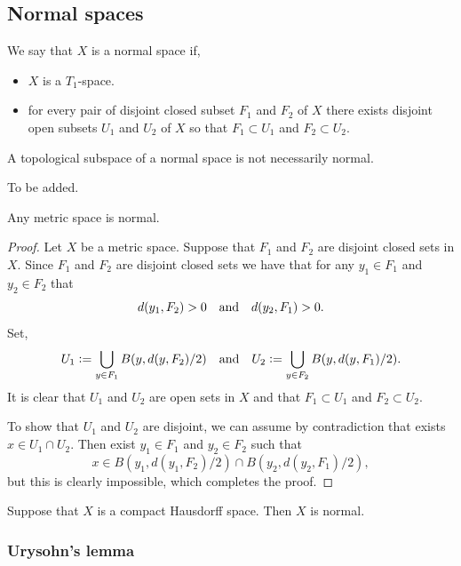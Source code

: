 \documentclass[11pt,a4paper]{article}
\begin{document}
\subsection{Normal spaces}

\begin{definition}
  We say that $X$ is a normal space if,
  \begin{itemize}
      \item[(1)] $X$ is a $T_1$-space.
      \item[(2)] for every pair of disjoint closed subset $F_1$ and $F_2$ 
        of $X$ there exists disjoint open subsets $U_1$ and $U_2$ of $X$
        so that $F_1 \subset U_1$ and $F_2 \subset U_2$.
    \end{itemize}
\end{definition}

\begin{remark}
  A topological subspace of a normal space is not necessarily normal.
\end{remark}
\begin{example}
  To be added.
\end{example}

\begin{proposition}
  Any metric space is normal.
\end{proposition}
\begin{proof}
  Let $X$ be a metric space.
  Suppose that $F_1$ and $F_2$ are disjoint closed sets in $X$.
  Since $F_1$ and $F_2$ are disjoint closed sets we have that for any
  $y_1 \in F_1$ and $y_2 \in F_2$ that
  \[
    d(y_1,F_2) > 0 \quad \text{and} \quad d(y_2,F_1) > 0.
  \]
  Set,
  \[
    U_1 := \bigcup_{y \in F_1} B(y,d(y,F_2) / 2) \quad \text{and} \quad
    U_2 := \bigcup_{y \in F_2} B(y,d(y,F_1) / 2).
  \]
  It is clear that $U_1$ and $U_2$ are open sets in $X$ and that 
  $F_1 \subset U_1$ and $F_2 \subset U_2$.

  To show that $U_1$ and $U_2$ are disjoint, we can assume by contradiction
  that exists $x \in U_1 \cap U_2$. Then exist $y_1 \in F_1$ and
  $y_2 \in F_2$ such that
  \[
    x \in B(y_1,d(y_1,F_2) / 2) \cap B(y_2,d(y_2,F_1) / 2),
  \]
  but this is clearly impossible, which completes the proof.
\end{proof}

\begin{proposition}
  Suppose that $X$ is a compact Hausdorff space. Then $X$ is normal.
\end{proposition}

\subsubsection{Urysohn’s lemma}
\end{document}
